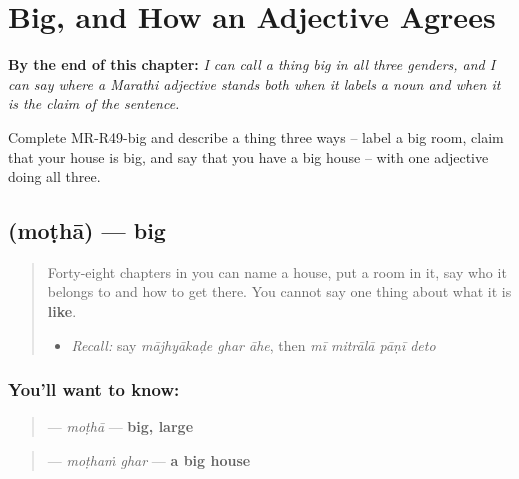 
\chapter{Big, and How an Adjective Agrees}
\label{ch:mr-the-adjective}

\begin{chapteropening}
\textbf{By the end of this chapter:} \emph{I can call a thing big in all three genders, and I can say where a Marathi adjective stands both when it labels a noun and when it is the claim of the sentence.}

Complete MR-R49-big and describe a thing three ways -- label a big room, claim that your house is big, and say that you have a big house -- with one adjective doing all three.
\end{chapteropening}

\section[\texorpdfstring{\mr{मोठा} (moṭhā)}{मोठा (moṭhā)}]{ (moṭhā) — big}

\label{lesson:MR-C49-motha}



\begin{quote}
Forty-eight chapters in you can name a house, put a room in it, say who it belongs to and how to get there. You cannot say one thing about what it is \textbf{like}.

\begin{itemize}
\raggedright
  \item \emph{Recall:} say \emph{mājhyākaḍe ghar āhe}, then \emph{mī mitrālā pāṇī deto}
\end{itemize}
\end{quote}

\subsection*{You'll want to know: }
\begin{quote}
\textbf{} — \emph{moṭhā} — \textbf{big, large}
\end{quote}

\begin{quote}
\textbf{ } — \emph{moṭhaṁ ghar} — \textbf{a big house}
\end{quote}

